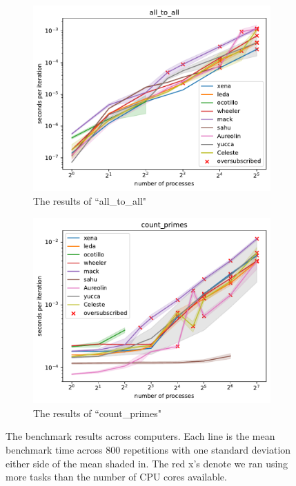 \documentclass{article}
\begin{document}
\begin{figure}[h]
    \centering
    \begin{subfigure}[b]{0.49\textwidth}
         \centering
         \includegraphics[width=\textwidth]{figures/final/all_to_all.pdf}
         \caption{The results of ``all\_to\_all"}
         \label{fig:all_to_all}
     \end{subfigure}
     \hfill
     \begin{subfigure}[b]{0.49\textwidth}
         \centering
         \includegraphics[width=\textwidth]{figures/final/count_primes.pdf}
         \caption{The results of ``count\_primes"}
         \label{fig:count_primes}
     \end{subfigure}
     \hfill
    \caption{The benchmark results across computers. Each line is the mean benchmark time across 800 repetitions with one standard deviation either side of the mean shaded in. The red x's denote we ran using more tasks than the number of CPU cores available. }
    \label{fig:direct}
\end{figure}
\end{document}
